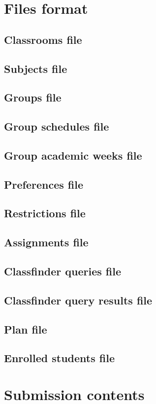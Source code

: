 \section{Files format}

\subsection{Classrooms file}
\subsection{Subjects file}
\subsection{Groups file}
\subsection{Group schedules file}
\subsection{Group academic weeks file}
\subsection{Preferences file}
\subsection{Restrictions file}
\subsection{Assignments file}
\subsection{Classfinder queries file}
\subsection{Classfinder query results file}
\subsection{Plan file}
\subsection{Enrolled students file}



\section{Submission contents}

